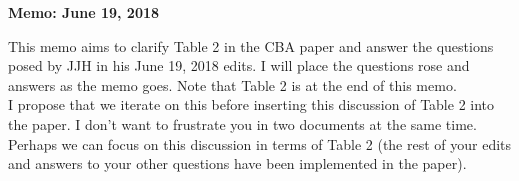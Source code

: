 


\newcommand*\leftright[2]{%
  \leavevmode
  \rlap{#1}%
  \hspace{0.5\linewidth}%
  #2}

\newcommand{\orth}{\ensuremath{\perp\!\!\!\perp}}%
\newcommand{\indep}{\orth}%
\newcommand{\notorth}{\ensuremath{\perp\!\!\!\!\!\!\diagup\!\!\!\!\!\!\perp}}%
\newcommand{\notindep}{\notorth}







\begin{center}
\textbf{Memo: June 19, 2018}
\end{center}

\doublespacing

\noindent This memo aims to clarify Table 2 in the CBA paper and answer the questions posed by JJH in his June 19, 2018 edits. I will place the questions rose and answers as the memo goes. Note that Table 2 is at the end of this memo.\\

\noindent I propose that we iterate on this before inserting this discussion of Table 2 into the paper. I don't want to frustrate you in two documents at the same time. Perhaps we can focus on this discussion in terms of Table 2 (the rest of your edits and answers to your other questions have been implemented in the paper).\\

